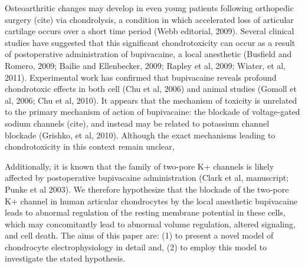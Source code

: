 Osteoarthritic changes may develop in even young patients following orthopedic surgery (cite) via chondrolysis, a condition in which accelerated loss of articular cartilage occurs over a short time period (Webb editorial, 2009).
Several clinical studies have suggested that this significant chondrotoxicity can occur as a result of postoperative administration of bupivacaine, a local anesthetic (Busfield and Romero, 2009; Bailie and Ellenbecker, 2009; Rapley et al, 2009; Wiater, et al, 2011). 
Experimental work has confirmed that bupivacaine reveals profound chondrotoxic effects in both cell (Chu et al, 2006) and animal studies (Gomoll et al, 2006; Chu et al, 2010).
It appears that the mechanism of toxicity is unrelated to the primary mechanism of action of bupivacaine: the blockade of voltage-gated sodium channels (cite), and instead may be related to potassium channel blockade (Grishko, et al, 2010). 
Although the exact mechanisms leading to chondrotoxicity in this context remain unclear,


Additionally, it is known that the family of two-pore K+ channels is likely affected by postoperative bupivacaine administration (Clark et al, manuscript; Punke et al 2003).
We therefore hypothesize that the blockade of the two-pore K+ channel in human articular chondrocytes by the local anesthetic bupivacaine leads to abnormal regulation of the resting membrane potential in these cells, which may concomitantly lead to abnormal volume regulation, altered signaling, and cell death.
The aims of this paper are: (1) to present a novel model of chondrocyte electrophysiology in detail and, (2) to employ this model to investigate the stated hypothesis.



